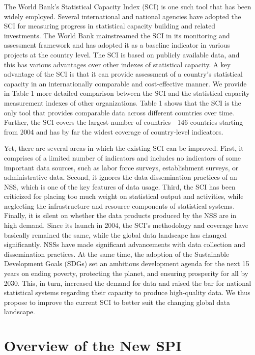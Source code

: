 \documentclass[
]{article}
\begin{document}
The World Bank's Statistical Capacity Index (SCI) is one such tool that
has been widely employed. Several international and national agencies
have adopted the SCI for measuring progress in statistical capacity
building and related investments. The World Bank mainstreamed the SCI in
its monitoring and assessment framework and has adopted it as a baseline
indicator in various projects at the country level. The SCI is based on
publicly available data, and this has various advantages over other
indexes of statistical capacity. A key advantage of the SCI is that it
can provide assessment of a country's statistical capacity in an
internationally comparable and cost-effective manner. We provide in
Table 1 more detailed comparison between the SCI and the statistical
capacity measurement indexes of other organizations. Table 1 shows that
the SCI is the only tool that provides comparable data across different
countries over time. Further, the SCI covers the largest number of
countries---146 countries starting from 2004 and has by far the widest
coverage of country-level indicators.

Yet, there are several areas in which the existing SCI can be improved.
First, it comprises of a limited number of indicators and includes no
indicators of some important data sources, such as labor force surveys,
establishment surveys, or administrative data. Second, it ignores the
data dissemination practices of an NSS, which is one of the key features
of data usage. Third, the SCI has been criticized for placing too much
weight on statistical output and activities, while neglecting the
infrastructure and resource components of statistical systems. Finally,
it is silent on whether the data products produced by the NSS are in
high demand. Since its launch in 2004, the SCI's methodology and
coverage have basically remained the same, while the global data
landscape has changed significantly. NSSs have made significant
advancements with data collection and dissemination practices. At the
same time, the adoption of the Sustainable Development Goals (SDGs) set
an ambitious development agenda for the next 15 years on ending poverty,
protecting the planet, and ensuring prosperity for all by 2030. This, in
turn, increased the demand for data and raised the bar for national
statistical systems regarding their capacity to produce high-quality
data. We thus propose to improve the current SCI to better suit the
changing global data landscape.

\hypertarget{overview-of-the-new-spi}{%
\section{Overview of the New SPI}\label{overview-of-the-new-spi}}
\end{document}
